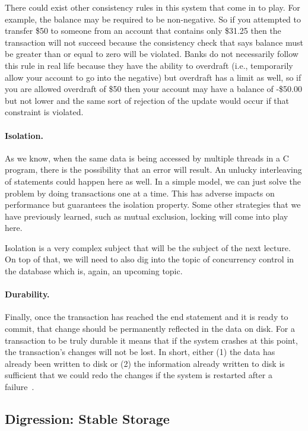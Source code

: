 There could exist other consistency rules in this system that come in to play. For example, the balance may be required to be non-negative. So if you attempted to transfer \$50 to someone from an account that contains only \$31.25 then the transaction will not succeed because the consistency check that says balance must be greater than or equal to zero will be violated. Banks do not necessarily follow this rule in real life because they have the ability to overdraft (i.e., temporarily allow your account to go into the negative) but overdraft has a limit as well, so if you are allowed overdraft of \$50 then your account may have a balance of -\$50.00 but not lower and the same sort of rejection of the update would occur if that constraint is violated.

\paragraph{Isolation.} As we know, when the same data is being accessed by multiple threads in a C program, there is the possibility that an error will result. An unlucky interleaving of statements could happen here as well. In a simple model, we can just solve the problem by doing transactions one at a time. This has adverse impacts on performance but guarantees the isolation property. Some other strategies that we have previously learned, such as mutual exclusion, locking will come into play here. 

Isolation is a very complex subject that will be the subject of the next lecture. On top of that, we will need to also dig into the topic of concurrency control in the database which is, again, an upcoming topic. 

\paragraph{Durability.} Finally, once the transaction has reached the end statement and it is ready to commit, that change should be permanently reflected in the data on disk. For a transaction to be truly durable it means that if the system crashes at this point, the transaction's changes will not be lost. In short, either (1) the data has already been written to disk or (2) the information already written to disk is sufficient that we could redo the changes if the system is restarted after a failure~\cite{dsc}.

\subsection*{Digression: Stable Storage}

